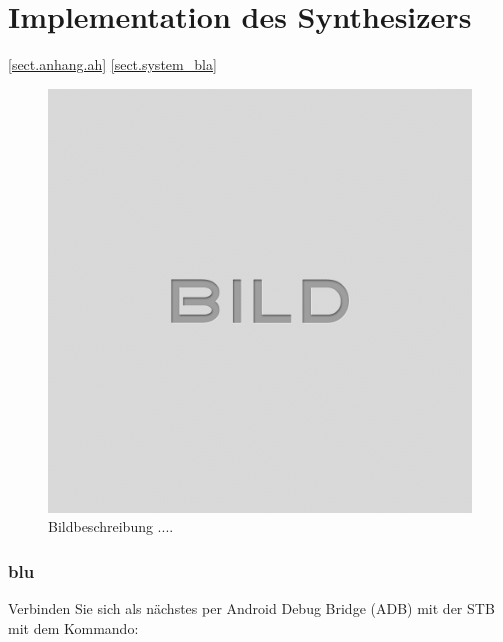 
\chapter{Implementation des Synthesizers}\label{chap.implementation}

\ref{sect.anhang.ah} 
\ref{sect.system_bla}

\begin{figure}[H]
	\centering
	\includegraphics[width=\textwidth]{images/idle.png}
	\caption{Bildbeschreibung ....}
	\label{fig.system.bild8}
\end{figure}

\subsection{blu}\label{sect.system_blue}



Verbinden Sie sich als nächstes per Android Debug Bridge (ADB) mit der STB mit dem Kommando:
\newline
\newline